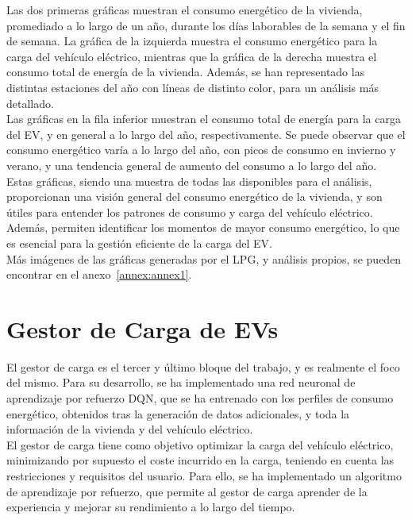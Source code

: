 Las dos primeras gráficas muestran el consumo energético de la vivienda, promediado a lo largo de 
un año, durante los días laborables de la semana y el fin de semana. La gráfica de la izquierda 
muestra el consumo energético para la carga del vehículo eléctrico, mientras que la gráfica de la 
derecha muestra el consumo total de energía de la vivienda. Además, se han representado las 
distintas estaciones del año con líneas de distinto color, para un análisis más detallado.\\

Las gráficas en la fila inferior muestran el consumo total de energía para la carga del EV, y en
general a lo largo del año, respectivamente. Se puede observar que el consumo energético varía a lo 
largo del año, con picos de consumo en invierno y verano, y una tendencia general de aumento del 
consumo a lo largo del año.\\

Estas gráficas, siendo una muestra de todas las disponibles para el análisis, proporcionan una 
visión general del consumo energético de la vivienda, y son útiles para entender los patrones de
consumo y carga del vehículo eléctrico. Además, permiten identificar los momentos de mayor
consumo energético, lo que es esencial para la gestión eficiente de la carga del EV.\\

Más imágenes de las gráficas generadas por el LPG, y análisis propios, se pueden encontrar en el
anexo~\ref{annex:annex1}.

\section{Gestor de Carga de EVs}
El gestor de carga es el tercer y último bloque del trabajo, y es realmente el foco del mismo. 
Para su desarrollo, se ha implementado una red neuronal de aprendizaje por refuerzo DQN, que se ha 
entrenado con los perfiles de consumo energético, obtenidos tras la generación de datos adicionales, 
y toda la información de la vivienda y del vehículo eléctrico.\\

El gestor de carga tiene como objetivo optimizar la carga del vehículo eléctrico, minimizando por 
supuesto el coste incurrido en la carga, teniendo en cuenta las restricciones y requisitos del usuario. 
Para ello, se ha implementado un algoritmo de aprendizaje por refuerzo, que permite al gestor de carga 
aprender de la experiencia y mejorar su rendimiento a lo largo del tiempo.\\

